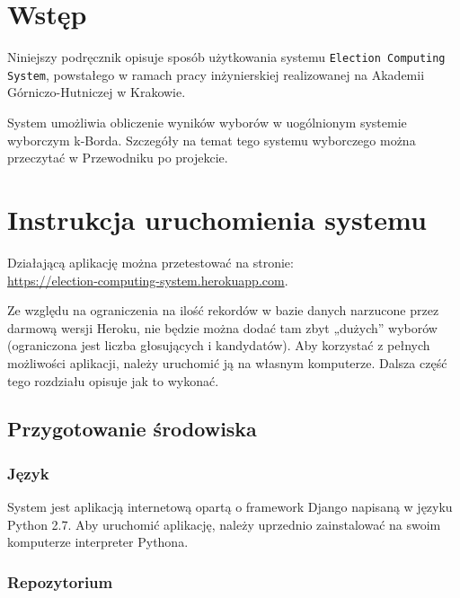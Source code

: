 \documentclass{../aghdoc}               %
\author{Tomasz Kasprzyk, Daniel Ogiela, Jakub Stępak}
\date{2016}
\begin{document}
\titlepages

\tableofcontents


\chapter{Wstęp}
\label{cha:wstep}

Niniejszy podręcznik opisuje sposób użytkowania systemu \texttt{Election Computing System}, powstałego w ramach pracy inżynierskiej realizowanej na Akademii Górniczo-Hutniczej w Krakowie.

System umożliwia obliczenie wyników wyborów w uogólnionym systemie wyborczym k-Borda. Szczegóły na temat tego systemu wyborczego można przeczytać w Przewodniku po projekcie.


\chapter{Instrukcja uruchomienia systemu}
\label{cha:uruchomienie}

Działającą aplikację można przetestować na stronie: \\ \url{https://election-computing-system.herokuapp.com}. 

Ze względu na ograniczenia na ilość rekordów w bazie danych narzucone przez darmową wersji Heroku, nie będzie można dodać tam zbyt „dużych” wyborów (ograniczona jest liczba głosujących i kandydatów). Aby korzystać z pełnych możliwości aplikacji, należy uruchomić ją na własnym komputerze. Dalsza część tego rozdziału opisuje jak to wykonać.

\section{Przygotowanie środowiska}
\label{sec:srodowisko}

\subsection{Język}
\label{subsec:jezyk}

System jest aplikacją internetową opartą o framework Django napisaną w języku Python 2.7.
Aby uruchomić aplikację, należy uprzednio zainstalować na swoim komputerze interpreter Pythona.

\subsection{Repozytorium}
\label{subsec:repo}
\end{document}

